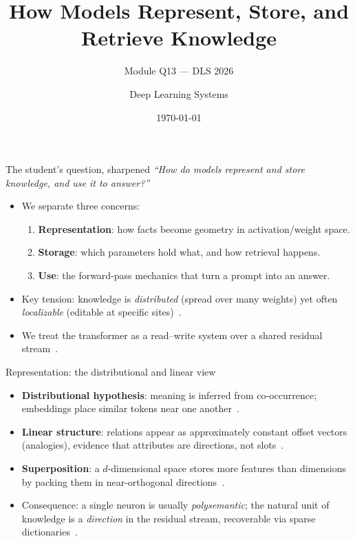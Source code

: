\documentclass[aspectratio=169,11pt]{beamer}
\title{How Models Represent, Store, and Retrieve Knowledge}
\subtitle{Module Q13 --- DLS 2026}
\author{Deep Learning Systems}
\date{\today}
\begin{document}
\maketitle

\begin{frame}{The student's question, sharpened}
  \emph{``How do models represent and store knowledge, and use it to answer?''}
  \begin{itemize}
    \item We separate three concerns:
    \begin{enumerate}
      \item \textbf{Representation}: how facts become geometry in activation/weight space.
      \item \textbf{Storage}: which parameters hold what, and how retrieval happens.
      \item \textbf{Use}: the forward-pass mechanics that turn a prompt into an answer.
    \end{enumerate}
    \item Key tension: knowledge is \emph{distributed} (spread over many weights) yet
      often \emph{localizable} (editable at specific sites)~\cite{meng2022rome}.
    \item We treat the transformer as a read--write system over a shared residual stream~\cite{elhage2021mathematical}.
  \end{itemize}
\end{frame}

\begin{frame}{Representation: the distributional and linear view}
  \begin{itemize}
    \item \textbf{Distributional hypothesis}: meaning is inferred from co-occurrence;
      embeddings place similar tokens near one another~\cite{mikolov2013efficient}.
    \item \textbf{Linear structure}: relations appear as approximately constant offset
      vectors (analogies), evidence that attributes are directions, not slots~\cite{mikolov2013linguistic}.
    \item \textbf{Superposition}: a $d$-dimensional space stores more features than
      dimensions by packing them in near-orthogonal directions~\cite{elhage2022superposition}.
    \item Consequence: a single neuron is usually \emph{polysemantic}; the natural unit
      of knowledge is a \emph{direction} in the residual stream, recoverable via sparse
      dictionaries~\cite{bricken2023monosemanticity}.
  \end{itemize}
\end{frame}
\end{document}
